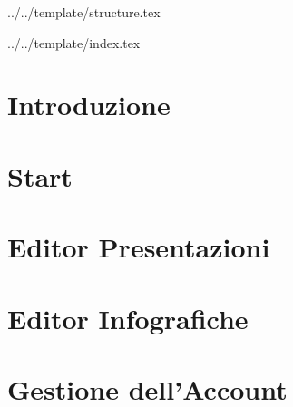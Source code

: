 

\def\DOCUMENTO{Manuale Utente}
\def\VERSIONE{1.0.0}

\def\DESCRIZIONE{Documento che facilità l'utilizzo dell'applicazione da parte dell'utente.}

\def\REDATTORE {}
\def\VERIFICATORE {}
\def\RESPONSABILE {}

\def\USO {Esterno}

\def\DISTRIBUZIONE {\GRUPPO{}\\ & \COMMITTENTE{}\\}


\def\INDICE	{true}
\def\TABELLE {true}
\def\FIGURE {true}


 {../../template/structure.tex}


 {../../template/index.tex}

\section{Introduzione}

\newpage
\section{Start}

\newpage
\section{Editor Presentazioni}

\newpage
\section{Editor Infografiche}

\newpage
\section{Gestione dell'Account}






